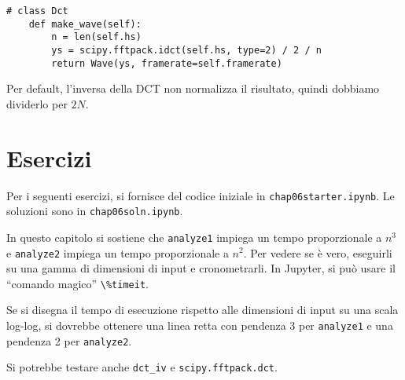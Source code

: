 \documentclass[12pt,a4paper]{book}
\begin{document}
\begin{verbatim} 
# class Dct
    def make_wave(self):
        n = len(self.hs)
        ys = scipy.fftpack.idct(self.hs, type=2) / 2 / n
        return Wave(ys, framerate=self.framerate)
 \end{verbatim} 

Per default, l'inversa della DCT non normalizza il risultato, quindi dobbiamo dividerlo per $2N$.

\section{Esercizi} 

Per i seguenti esercizi, si fornisce del codice iniziale in {\tt chap06starter.ipynb}. Le soluzioni sono in {\tt chap06soln.ipynb}.

\begin{exercise} In questo capitolo si sostiene che {\tt analyze1} impiega un tempo proporzionale a $n^3$ e {\tt analyze2} impiega un tempo proporzionale a $n^2$. Per vedere se è vero, eseguirli su una gamma di dimensioni di input e cronometrarli. In Jupyter, si può usare il ``comando magico'' \verb"\%timeit".

Se si disegna il tempo di esecuzione rispetto alle dimensioni di input su una scala log-log, si dovrebbe ottenere una linea retta con pendenza 3 per {\tt analyze1} e una pendenza 2 per {\tt analyze2}.

Si potrebbe testare anche \verb"dct_iv" e {\tt scipy.fftpack.dct}.

\end{exercise} 
\end{document}
